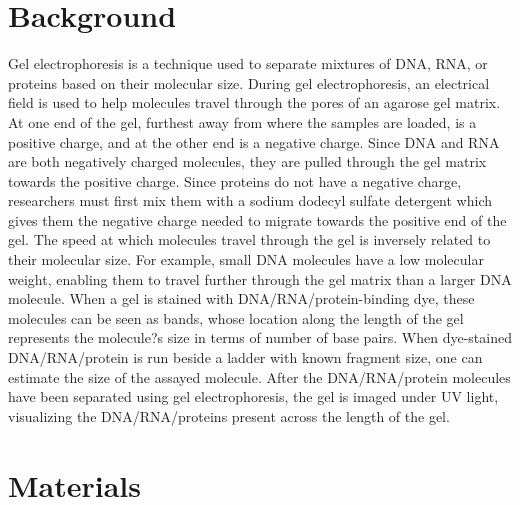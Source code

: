 \documentclass[
  letterpaper,
  DIV=11,
  numbers=noendperiod]{scrreprt}
\begin{document}
\hypertarget{background}{%
\section{Background}\label{background}}

Gel electrophoresis is a technique used to separate mixtures of DNA,
RNA, or proteins based on their molecular size. During gel
electrophoresis, an electrical field is used to help molecules travel
through the pores of an agarose gel matrix. At one end of the gel,
furthest away from where the samples are loaded, is a positive charge,
and at the other end is a negative charge. Since DNA and RNA are both
negatively charged molecules, they are pulled through the gel matrix
towards the positive charge. Since proteins do not have a negative
charge, researchers must first mix them with a sodium dodecyl sulfate
detergent which gives them the negative charge needed to migrate towards
the positive end of the gel. The speed at which molecules travel through
the gel is inversely related to their molecular size. For example, small
DNA molecules have a low molecular weight, enabling them to travel
further through the gel matrix than a larger DNA molecule. When a gel is
stained with DNA/RNA/protein-binding dye, these molecules can be seen as
bands, whose location along the length of the gel represents the
molecule?s size in terms of number of base pairs. When dye-stained
DNA/RNA/protein is run beside a ladder with known fragment size, one can
estimate the size of the assayed molecule. After the DNA/RNA/protein
molecules have been separated using gel electrophoresis, the gel is
imaged under UV light, visualizing the DNA/RNA/proteins present across
the length of the gel.

\hypertarget{materials-5}{%
\section{Materials}\label{materials-5}}
\end{document}
